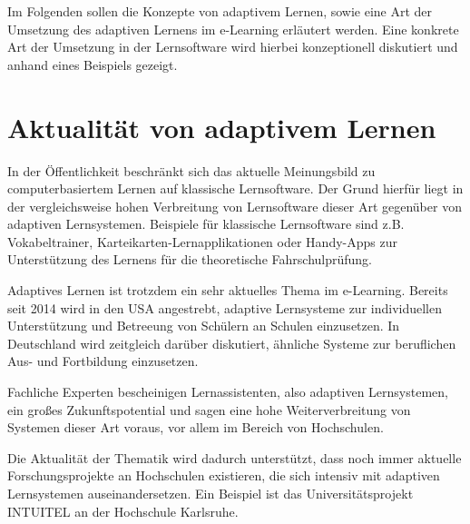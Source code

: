 Im Folgenden sollen die Konzepte von adaptivem Lernen, sowie eine Art der
Umsetzung des adaptiven Lernens im e-Learning erläutert werden.
Eine konkrete Art der Umsetzung in der Lernsoftware wird hierbei konzeptionell
diskutiert und anhand eines Beispiels gezeigt.

\section{Aktualität von adaptivem Lernen}
In der Öffentlichkeit beschränkt sich das aktuelle Meinungsbild zu computerbasiertem Lernen
auf klassische Lernsoftware. Der Grund hierfür liegt in der vergleichsweise hohen Verbreitung
von Lernsoftware dieser Art gegenüber von adaptiven Lernsystemen. Beispiele für klassische Lernsoftware
sind z.B. Vokabeltrainer, Karteikarten-Lernapplikationen oder Handy-Apps zur Unterstützung des Lernens für die theoretische
Fahrschulprüfung.

Adaptives Lernen ist trotzdem ein sehr aktuelles Thema im e-Learning.
Bereits seit 2014 wird in den USA angestrebt, adaptive Lernsysteme zur
individuellen Unterstützung und Betreeung von Schülern an Schulen einzusetzen.
In Deutschland wird zeitgleich darüber diskutiert, ähnliche Systeme zur beruflichen Aus- und Fortbildung
einzusetzen.
\cite[S. 2, S. 8]{mmb2014}

Fachliche Experten bescheinigen Lernassistenten, also adaptiven Lernsystemen, ein großes Zukunftspotential
und sagen eine hohe Weiterverbreitung von Systemen dieser Art voraus, vor allem im Bereich von Hochschulen.
\cite[S. 2]{mmb2014}

Die Aktualität der Thematik wird dadurch unterstützt, dass noch immer aktuelle
Forschungsprojekte an Hochschulen existieren, die sich intensiv mit adaptiven Lernsystemen auseinandersetzen.
Ein Beispiel ist das Universitätsprojekt INTUITEL an der Hochschule Karlsruhe.
\cite[S. 2]{mmb2014}
